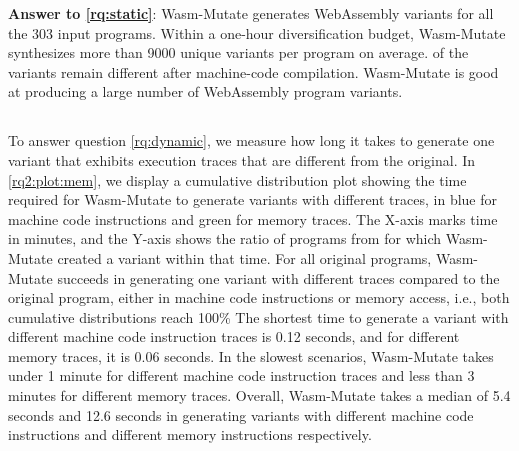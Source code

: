 \documentclass[a4paper,fleqn]{cas-dc}
\newcommand{\tool}{{\sc Wasm-Mutate}\xspace}
\newcommand{\Wasm}{WebAssembly\xspace}
\newcommand{\wasm}{\Wasm}
\begin{document}
\begin{tcolorbox}[boxrule=1pt,arc=.3em,boxsep=-1.3mm]
  \textbf{Answer to \ref{rq:static}}: \tool generates \wasm variants for all the 303 input programs. 
  Within a one-hour diversification budget, \tool synthesizes more than 9000 unique  variants per program on average. 
  \preserved of the variants remain different after machine-code compilation.
  \tool is good at producing a large number of \Wasm program variants.
\end{tcolorbox}


\subsection{\rqdynamic}


To answer question \ref{rq:dynamic},   we measure how long it takes to generate one variant that exhibits execution traces that are different from the original.
In \autoref{rq2:plot:mem}, we display a cumulative distribution plot showing the time required for \tool to generate variants with different traces, in blue for machine code instructions and green for memory traces.
The X-axis marks time in minutes, and the Y-axis shows the ratio of programs from \nProgramsRosetta for which \tool created a variant within that time.
For all original programs, \tool succeeds in  generating one variant with different traces compared to the original program, either in machine code instructions or memory access, i.e., both cumulative distributions reach 100\%
The shortest time to generate a variant with different machine code instruction traces is 0.12 seconds, and for different memory traces, it is 0.06 seconds. 
In the slowest scenarios, \tool takes under 1 minute for different machine code instruction traces and less than 3 minutes for different memory traces.
Overall, \tool takes a median of 5.4 seconds and 12.6 seconds in generating variants with different machine code instructions and different memory instructions respectively.
\end{document}
